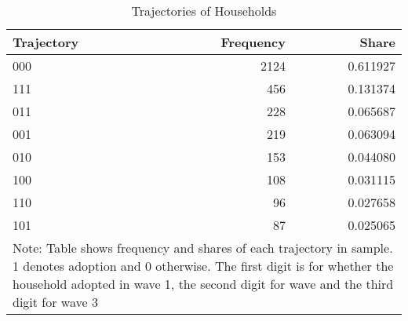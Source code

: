 \begin{table}
\centering
\caption{Trajectories of Households}
\label{tbl:trajectories}
\begin{tabular}{lrr}
\toprule
Trajectory &  Frequency &    Share \\
\midrule
       000 &       2124 & 0.611927 \\
       111 &        456 & 0.131374 \\
       011 &        228 & 0.065687 \\
       001 &        219 & 0.063094 \\
       010 &        153 & 0.044080 \\
       100 &        108 & 0.031115 \\
       110 &         96 & 0.027658 \\
       101 &         87 & 0.025065 \\
\bottomrule
\multicolumn{3}{l}{Note: Table shows frequency and shares of each trajectory in sample. 1 denotes adoption and 0 otherwise. The first digit is for whether the household adopted in wave 1, the second digit for wave and the third digit for wave 3}
\end{tabular}
\end{table}
